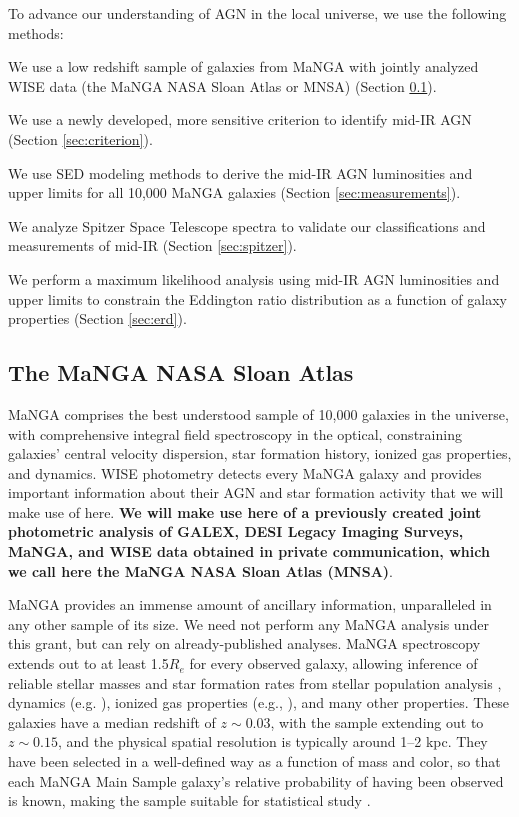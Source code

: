 \documentclass[12pt, preprint]{hacked-aastex}
\newlength{\mylen}
\newenvironment{ditemize}
{ \begin{list}{}{%
\setlength{\topsep}{0pt}%
\setlength{\partopsep}{3pt}%
\setlength{\itemsep}{1pt}\setlength{\parsep}{1pt}%
\setlength{\itemindent}{0pt}\setlength{\listparindent}{12pt}%
\setlength{\leftmargin}{24pt}\setlength{\rightmargin}{0in}%
\setlength{\labelsep}{3pt}\setlength{\labelwidth}{6pt}%
\setlength{\mylen}{3pt}
\renewcommand{\makelabel}{\makebox[\labelwidth][l]{\raisebox{\mylen}{\tiny$\bullet$}\hspace{\fill}}}}}
{\end{list}}
\begin{document}
To advance our understanding of AGN in the local universe, we use the
following methods:
\begin{ditemize}
    \item We use a low redshift sample of galaxies from MaNGA with 
    jointly analyzed WISE data (the MaNGA NASA Sloan Atlas or MNSA)
    (Section \ref{sec:mnsa}).
    \item We use a newly developed, more sensitive criterion to 
    identify mid-IR AGN (Section \ref{sec:criterion}).
    \item We use SED modeling methods to derive the mid-IR AGN
      luminosities and upper limits for all 10,000 MaNGA galaxies
      (Section \ref{sec:measurements}).
    \item We analyze Spitzer Space Telescope spectra to validate our 
    classifications and measurements of mid-IR (Section
    \ref{sec:spitzer}).
    \item We perform a maximum likelihood analysis using mid-IR AGN luminosities 
     and upper limits to constrain the Eddington ratio  distribution as a 
     function of galaxy properties (Section \ref{sec:erd}).
\end{ditemize}

\subsection{The MaNGA NASA Sloan Atlas}
\label{sec:mnsa}

MaNGA comprises the best understood sample of 10,000 galaxies in the
universe, with comprehensive integral field spectroscopy in the
optical, constraining galaxies' central velocity dispersion, star
formation history, ionized gas properties, and dynamics. WISE
photometry detects every MaNGA galaxy and provides important
information about their AGN and star formation activity that we will
make use of here. {\bf We will make use here of a previously created
  joint photometric analysis of GALEX, DESI Legacy Imaging Surveys,
  MaNGA, and WISE data obtained in private communication, which we
  call here the MaNGA NASA Sloan Atlas (MNSA)}.

MaNGA provides an immense amount of ancillary information,
unparalleled in any other sample of its size. We need not perform any
MaNGA analysis under this grant, but can rely on already-published
analyses. MaNGA spectroscopy extends out to at least 1.5$R_e$ for
every observed galaxy, allowing inference of reliable stellar masses
and star formation rates from stellar population analysis
\cite{sanchez22a}, dynamics (e.g. \cite{graham18a}), ionized gas
properties (e.g., \cite{belfiore17a}), and many other properties.
These galaxies have a median redshift of $z\sim0.03$, with the sample
extending out to $z\sim 0.15$, and the physical spatial resolution is
typically around 1--2 kpc. They have been selected in a well-defined
way as a function of mass and color, so that each MaNGA Main Sample
galaxy's relative probability of having been observed is known, making
the sample suitable for statistical study \cite{wake17a}.
\end{document}
